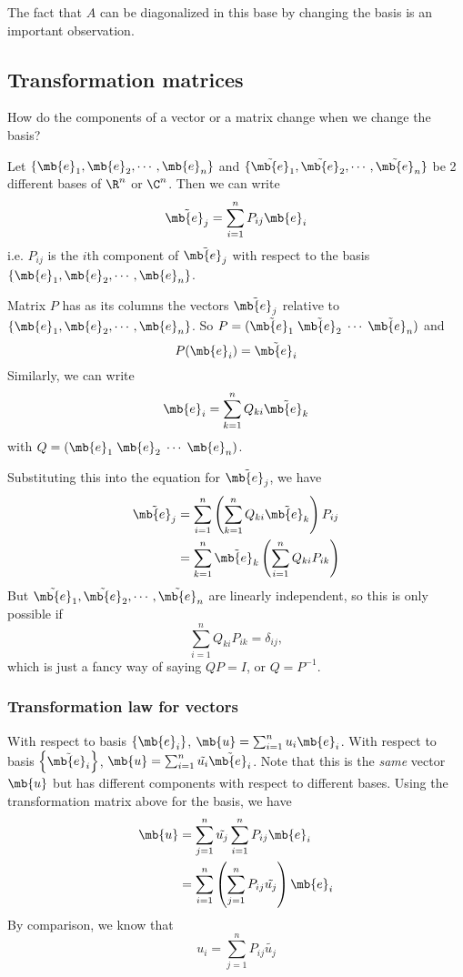 \documentclass[a4paper]{article}
\begin{document}
The fact that $A$ can be diagonalized in this base by changing the basis is an important observation.

\subsection{Transformation matrices}
How do the components of a vector or a matrix change when we change the basis?

Let $\{\mb{e}_1, \mb{e}_2, \cdots, \mb{e}_n\}$ and $\{\tilde{\mb{e}}_1, \tilde{\mb{e}}_2,\cdots,  \tilde{\mb{e}}_n\}$ be 2 different bases of $\R^n$ or $\C^n$. Then we can write
\[
\tilde{\mb{e}_j} = \sum_{i = 1}^n P_{ij}\mb{e}_i
\]
i.e. $P_{ij}$ is the $i$th component of $\tilde{\mb{e}_j}$ with respect to the basis $\{\mb{e}_1, \mb{e}_2, \cdots, \mb{e}_n\}$.

Matrix $P$ has as its columns the vectors $\tilde{\mb{e}_j}$ relative to $\{\mb{e}_1, \mb{e}_2, \cdots, \mb{e}_n\}$. So $P = (\tilde{\mb{e}_1}\; \tilde{\mb{e}_2}\; \cdots \; \tilde{\mb{e}_n})$ and 
\[
P(\mb{e}_i) = \tilde{\mb{e}_i}
\]
Similarly, we can write 
\[
\mb{e}_i = \sum_{k = 1}^nQ_{ki} \tilde{\mb{e}_k}
\]
with $Q = (\mb{e}_1\; \mb{e}_2\;\cdots\;\mb{e}_n)$.

Substituting this into the equation for $\tilde{\mb{e}_j}$, we have
\begin{align*}
  \tilde{\mb{e}_j} &= \sum_{i = 1}^n\left(\sum_{k = 1}^{n} Q_{ki}\tilde{\mb{e}_k}\right)P_{ij}\\
  &= \sum_{k = 1}^n \tilde{\mb{e}_k} \left(\sum_{i = 1}^n Q_{ki}P_{ik}\right)
\end{align*}
But $\tilde{\mb{e}}_1, \tilde{\mb{e}}_2,\cdots,  \tilde{\mb{e}}_n$ are linearly independent, so this is only possible if 
\[
\sum_{i = 1}^n Q_{ki}P_{ik} = \delta_{ij},
\]
which is just a fancy way of saying $QP = I$, or $Q = P^{-1}$.

\subsubsection{Transformation law for vectors}
With respect to basis $\left\{\mb{e}_i\right\}$, $\mb{u} = \sum_{i = 1}^n u_i\mb{e}_i$. 
With respect to basis $\left\{\tilde{\mb{e}_i}\right\}$, $\mb{u} = \sum_{i = 1}^n \tilde{u_i}\tilde{\mb{e}_i}$. Note that this is the \emph{same} vector $\mb{u}$ but has different components with respect to different bases. Using the transformation matrix above for the basis, we have
\begin{align*}
  \mb{u} &= \sum_{j= 1}^n \tilde{u_j} \sum_{i = 1}^{n}P_{ij}\mb{e}_i\\
  &= \sum_{i = 1}^n \left(\sum_{j = 1}^n P_{ij}\tilde{u_j}\right) \mb{e}_i
\end{align*}
By comparison, we know that 
\[
u_i = \sum_{j = 1}^n P_{ij}\tilde{u_j}
\]
\end{document}

